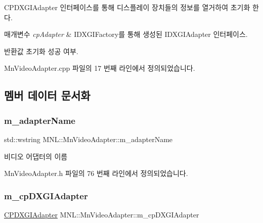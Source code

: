 C\+P\+D\+X\+G\+I\+Adapter 인터페이스를 통해 디스플레이 장치들의 정보를 열거하여 초기화 한다. 


\begin{DoxyParams}{매개변수}
{\em cp\+Adapter} & I\+D\+X\+G\+I\+Factory를 통해 생성된 I\+D\+X\+G\+I\+Adapter 인터페이스. \\
\hline
\end{DoxyParams}
\begin{DoxyReturn}{반환값}
초기화 성공 여부. 
\end{DoxyReturn}


Mn\+Video\+Adapter.\+cpp 파일의 17 번째 라인에서 정의되었습니다.



\subsection{멤버 데이터 문서화}
\mbox{\label{class_m_n_l_1_1_mn_video_adapter_a9c2e2e0b3a53a9fe378aa56b7017c2f5}} 
\subsubsection{\texorpdfstring{m\+\_\+adapter\+Name}{m\_adapterName}}
{\footnotesize\ttfamily std\+::wstring M\+N\+L\+::\+Mn\+Video\+Adapter\+::m\+\_\+adapter\+Name\hspace{0.3cm}{\ttfamily [private]}}



비디오 어댑터의 이름 



Mn\+Video\+Adapter.\+h 파일의 76 번째 라인에서 정의되었습니다.

\mbox{\label{class_m_n_l_1_1_mn_video_adapter_ae743c79f46ca0fc26eaef14efe19a0b9}} 
\subsubsection{\texorpdfstring{m\+\_\+cp\+D\+X\+G\+I\+Adapter}{m\_cpDXGIAdapter}}
{\footnotesize\ttfamily \hyperlink{namespace_m_n_l_ab0e24805043a50c45364c389f8929f33}{C\+P\+D\+X\+G\+I\+Adapter} M\+N\+L\+::\+Mn\+Video\+Adapter\+::m\+\_\+cp\+D\+X\+G\+I\+Adapter\hspace{0.3cm}{\ttfamily [private]}}



